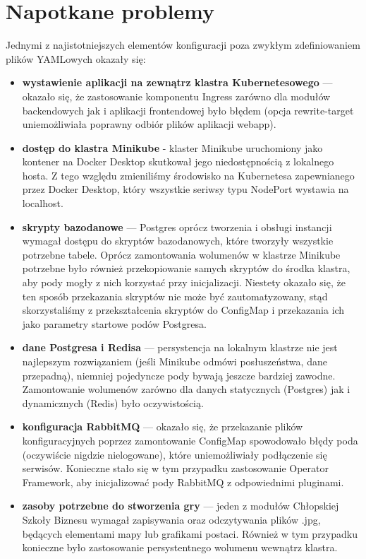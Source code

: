 \documentclass[polish]{aghengthesis}
\begin{document}
\section{Napotkane problemy}
\par Jednymi z najistotniejszych elementów konfiguracji poza zwykłym zdefiniowaniem plików YAMLowych okazały się:
\begin{itemize}
    \item \textbf{wystawienie aplikacji na zewnątrz klastra Kubernetesowego} — okazało się, że zastosowanie komponentu Ingress zarówno dla modułów backendowych jak i aplikacji frontendowej było błędem (opcja rewrite-target uniemożliwiała poprawny odbiór plików aplikacji webapp).
    \item \textbf{dostęp do klastra Minikube} - klaster Minikube uruchomiony jako kontener na Docker Desktop skutkował jego niedostępnością z lokalnego hosta. Z tego względu zmieniliśmy środowisko na Kubernetesa zapewnianego przez Docker Desktop, który wszystkie seriwsy typu NodePort wystawia na localhost.
    \item \textbf{skrypty bazodanowe} — Postgres oprócz tworzenia i obsługi instancji wymagał dostępu do skryptów bazodanowych, które tworzyły wszystkie potrzebne tabele. Oprócz zamontowania wolumenów w klastrze Minikube potrzebne było również przekopiowanie samych skryptów do środka klastra, aby pody mogły z nich korzystać przy inicjalizacji. Niestety okazało się, że ten sposób przekazania skryptów nie może być zautomatyzowany, stąd skorzystaliśmy z przekształcenia skryptów do ConfigMap i przekazania ich jako parametry startowe podów Postgresa.
    \item \textbf{dane Postgresa i Redisa} — persystencja na lokalnym klastrze nie jest najlepszym rozwiązaniem (jeśli Minikube odmówi posłuszeństwa, dane przepadną), niemniej pojedyncze pody bywają jeszcze bardziej zawodne. Zamontowanie wolumenów zarówno dla danych statycznych (Postgres) jak i dynamicznych (Redis) było oczywistością.
    \item \textbf{konfiguracja RabbitMQ} — okazało się, że przekazanie plików konfiguracyjnych poprzez zamontowanie ConfigMap spowodowało błędy poda (oczywiście nigdzie nielogowane), które uniemożliwiały podłączenie się serwisów. Konieczne stało się w tym przypadku zastosowanie Operator Framework, aby inicjalizować pody RabbitMQ z odpowiednimi pluginami.
    \item \textbf{zasoby potrzebne do stworzenia gry} — jeden z modułów Chłopskiej Szkoły Biznesu wymagał zapisywania oraz odczytywania plików .jpg, będących elementami mapy lub grafikami postaci. Również w tym przypadku konieczne było zastosowanie persystentnego wolumenu wewnątrz klastra.
    
\end{itemize}
\end{document}
